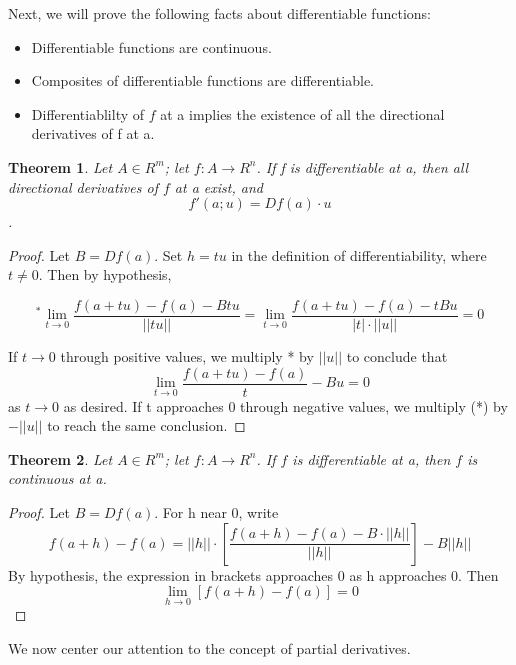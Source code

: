 \documentclass[12pt, letterpaper]{article}
\newtheorem{theorem}{Theorem}[section]
\begin{document}
		Next, we will prove the following facts about differentiable functions:
		\begin{itemize}
			\item Differentiable functions are continuous.
			\item Composites of differentiable functions are differentiable.
			\item Differentiablilty of $f$ at a implies the existence of all the directional derivatives of f at a.\newline
		\end{itemize}
		
		
		\begin{theorem}
			Let $A \in R^m$; let $f: A \to R^n$. If f is differentiable at a, then all directional derivatives of $f$ at a exist, and
				\[f'(a;u) = Df(a) \cdot u\].
		\end{theorem}
		\begin{proof}
			Let $B = Df(a)$. Set $h = tu$ in the definition of differentiability, where $t \ne 0$. Then by hypothesis,
			
				
				\[^* \lim_{t \to 0} \frac{f(a+tu) - f(a) - Btu}{||tu||} = \lim_{t \to 0} \frac{f(a+tu) - f(a)  - tBu}{|t|\cdot||u||} = 0\]
				
			If $t \to 0$ through positive values, we multiply * by $||u||$ to conclude that
				\[ \lim_{t \to 0} \frac{f(a+tu) - f(a)}{t} - Bu = 0\]
			as $t \to 0$ as desired.
			If t approaches 0 through negative values, we multiply (*) by $-||u||$ to reach the same conclusion.\newline
		\end{proof}		
		
		
		\begin{theorem}
			Let $A \in R^m$; let $f:A \to R^n$. If $f$ is differentiable at a, then $f$ is continuous at a.
		\end{theorem}
		\begin{proof}
			Let $B = Df(a)$. For h near 0, write\newline 
				\[ f(a+h) - f(a) = ||h||\cdot\left[ \frac{f(a+h) - f(a) - B\cdot||h||}{||h||}\right] - B||h||\]
			By hypothesis, the expression in brackets approaches 0 as h approaches 0.
			Then 
				\[\lim_{h\to0}\left[f(a+h) - f(a)\right] = 0\]
		\end{proof}
		
		
		
		We now center our attention to the concept of partial derivatives.
		
		
		
		
		
		
		
		
		
		
		
		
		
		
		
		
		
		
		
		
		
		
		
		
		
		
		
		
		
		
		
		
		
		
		
		
		
\end{document}
